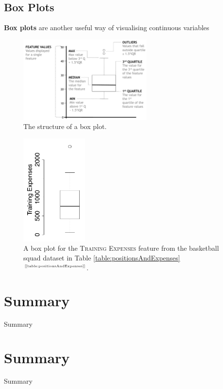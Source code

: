 \documentclass[xcolor={table}]{beamer}
\newcommand{\SectionSlide}[2][]{
	\ifthenelse{\isempty{#1}}
		{\section{#2}\begin{frame} \begin{center}\begin{huge}#2\end{huge}\end{center}\end{frame}}
		{\section[#1]{#2}\begin{frame} \begin{center}\begin{huge}#2\end{huge}\end{center}\end{frame}}
}
\newcommand{\keyword}[1]{\alert{\textbf{#1}}\index{#1}}
\newcommand{\featN}[1]{\textsc{#1}}
\newcommand{\ourRef}[1]{\ref{#1} $^{\text{\tiny[\pageref{#1}]}}$}
\begin{document}
\subsection{Box Plots}

 \begin{frame} 
 \keyword{Box plots} are another useful way of visualising continuous variables
 \begin{figure}
\centering
\includegraphics[width=0.6\textwidth]{./images/DataEx-BoxPlotStructure3.pdf}
\caption{The structure of a box plot.}
\label{fig:boxPlotStructure}
\end{figure}
\end{frame} 

 \begin{frame} 
 \begin{figure}
\centering
\includegraphics[width=0.3\textwidth]{./images/DataEx-BasketballSmallBoxPlot_TraingExpenses.pdf}
\caption{A box plot for the \featN{Training Expenses} feature from the basketball squad dataset in Table \ourRef{table:positionsAndExpenses}.}
\label{fig:boxPlotExample}
\end{figure}
\end{frame} 

\SectionSlide{Summary}

\begin{frame}
	\tableofcontents
\end{frame}
\end{document}
